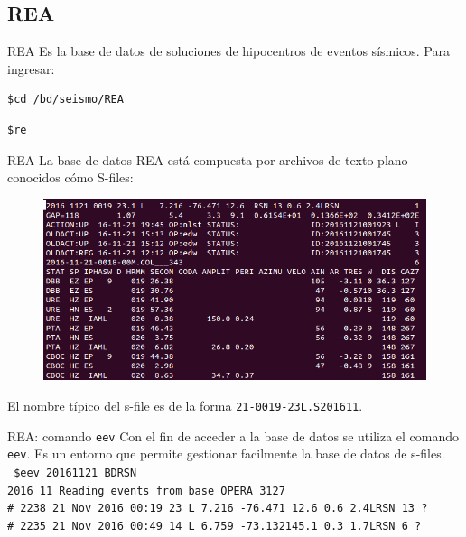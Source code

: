 \documentclass[11pt]{beamer}
\begin{document}
\subsection{REA}
\begin{frame}[fragile]{REA}
Es la base de datos de soluciones de hipocentros de eventos sísmicos. Para ingresar:\\
\begin{verbatim}
$cd /bd/seismo/REA
\end{verbatim}
\begin{verbatim}
$re
\end{verbatim}
\end{frame}

\begin{frame}{REA}
La base de datos REA está compuesta por archivos de texto plano conocidos cómo S-files:\\
\begin{center}
\begin{figure}
\includegraphics[scale=0.3]{sfile.png}
\end{figure}
\end{center}
El nombre típico del s-file es de la forma {\tt 21-0019-23L.S201611}.
\end{frame}

\begin{frame}[fragile]{REA: comando {\tt eev}}
Con el fin de acceder a la base de datos se utiliza el comando {\tt eev}. Es un entorno que permite gestionar facilmente la base de datos de s-files.\\
{\scriptsize \tt
\$eev 20161121 BDRSN\\
2016 11 Reading events from base OPERA  3127\\ 
\# 2238 21 Nov 2016 00:19 23  L   7.216 -76.471 12.6    0.6 2.4LRSN   13  ?\\
\# 2235 21 Nov 2016 00:49 14  L   6.759 -73.132145.1    0.3 1.7LRSN    6  ?\\
}
\end{frame}
\end{document}
